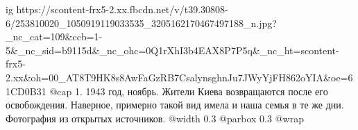  
 
 
 
 

\ifcmt
  ig https://scontent-frx5-2.xx.fbcdn.net/v/t39.30808-6/253810020_1050919119033535_3205162170467497188_n.jpg?_nc_cat=109&ccb=1-5&_nc_sid=b9115d&_nc_ohc=0Q1rXhI3b4EAX8P7P5q&_nc_ht=scontent-frx5-2.xx&oh=00_AT8T9HK8s8AwFaGzRB7CsalynsghnJu7JWyYjFH862oYIA&oe=61CD0B31
  @cap 1. 1943 год, ноябрь. Жители Киева возвращаются после его освобождения. Наверное, примерно такой вид имела и наша семья в те же дни. Фотография из открытых источников. 
  @width 0.3
  @parbox 0.3
  @wrap \parpic[r]
\fi
